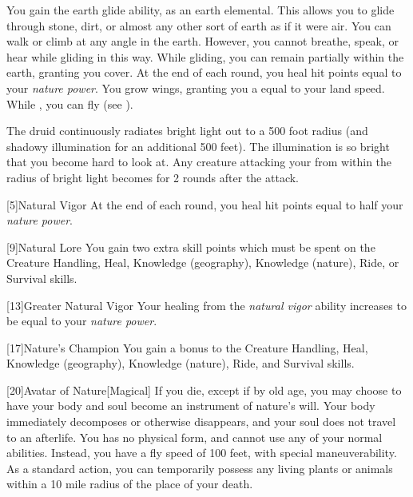             You gain the earth glide ability, as an earth elemental.
            This allows you to glide through stone, dirt, or almost any other sort of earth as if it were air.
            You can walk or climb at any angle in the earth.
            However, you cannot breathe, speak, or hear while gliding in this way.
            While gliding, you can remain partially within the earth, granting you cover.
            At the end of each round, you heal hit points equal to your \textit{nature power}.
            You grow wings, granting you a  equal to your land speed.
            While \unencumbered, you can fly (see ).

            The druid continuously radiates bright light out to a 500 foot radius (and shadowy illumination for an additional 500 feet).
            The illumination is so bright that you become hard to look at.
            Any creature attacking your from within the radius of bright light becomes \partiallyblinded for 2 rounds after the attack.

            [5]{Natural Vigor}
            At the end of each round, you heal hit points equal to half your \textit{nature power}.

            [9]{Natural Lore}
            You gain two extra skill points which must be spent on the Creature Handling, Heal, Knowledge (geography), Knowledge (nature), Ride, or Survival skills.

            [13]{Greater Natural Vigor}
            Your healing from the \textit{natural vigor} ability increases to be equal to your \textit{nature power}.

            [17]{Nature's Champion}
            You gain a  bonus to the Creature Handling, Heal, Knowledge (geography), Knowledge (nature), Ride, and Survival skills.

            [20]{Avatar of Nature}[Magical]
            If you die, except if by old age, you may choose to have your body and soul become an instrument of nature's will.
            Your body immediately decomposes or otherwise disappears, and your soul does not travel to an afterlife.
            You has no physical form, and cannot use any of your normal abilities.
            Instead, you have a fly speed of 100 feet, with special maneuverability.
            As a standard action, you can temporarily possess any living plants or animals within a 10 mile radius of the place of your death.

